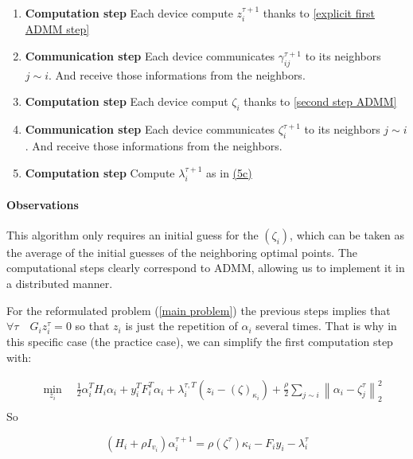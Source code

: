 \documentclass[10pt,english]{article}
\begin{document}
\begin{enumerate} \label{ADMM explicit}
    \item  \textbf{Computation step} Each device compute $z_i^{\tau+1}$ thanks to \ref{explicit first ADMM step}
    \item \textbf{Communication step} Each device communicates $\gamma_{ij}^{\tau  +1}$ to its neighbors $j\sim i$. And receive those informations from the neighbors.
    \item \textbf{Computation step}
    Each device comput $\zeta_i$ thanks to \ref{second step ADMM}
    \item \textbf{Communication step}
    Each device communicates $\zeta_{i}^{\tau+1}$ to its neighbors $j\sim i$. And receive those informations from the neighbors.
    \item \textbf{Computation step} Compute $\lambda_i^{\tau+1}$ as in \hyperref[Lagragian]{(5c)}  
\end{enumerate}

\paragraph{Observations}
This algorithm only requires an initial guess for the $(\zeta_i)$, which can be taken as the average of the initial guesses of the neighboring optimal points. The computational steps clearly correspond to ADMM, allowing us to implement it in a distributed manner. 

For the reformulated problem (\ref{main problem}) the previous steps implies that $\forall \tau \quad G_i z_i^\tau = 0 $ so that $z_i$ is just the repetition of $\alpha_i$ several times. That is why in this specific case (the practice case), we can simplify the first computation step with:

\begin{equation*}
\begin{aligned}
& \min_{z_i} \quad 
\frac{1}{2} \alpha_i^T H_i \alpha_i 
+ y_i^T F_i^T \alpha_i 
+ \lambda_i^{\tau,T} (z_i - (\zeta)_{\kappa_i})
+ \frac{\rho}{2} \sum_{j\sim i} \left\| \alpha_i - \zeta_j^\tau \right\|_2^2 \\
\end{aligned}
\end{equation*}
So

\begin{equation}\label{explicit first ADMM step}
(H_i + \rho I_{v_i} )\alpha_i^{\tau+1} =
\rho (\zeta^\tau)\kappa_i - F_i y_i - \lambda_i^\tau 
\end{equation}
\end{document}
